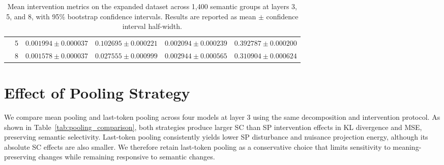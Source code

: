 \begin{table}[!htbp]
\begin{tabular}{p{1.5cm} p{0.75cm} p{2.00cm} p{2.00cm} p{2.00cm} p{2.00cm}}
& 5
& $0.001994 \pm 0.000037$
& $0.102695 \pm 0.000221$
& $0.002094 \pm 0.000239$
& $0.392787 \pm 0.000200$ \\
& 8
& $0.001578 \pm 0.000037$
& $0.027555 \pm 0.000999$
& $0.002944 \pm 0.000565$
& $0.310904 \pm 0.000624$ \\
\bottomrule
\end{tabular}
\vspace{0.4em}
\caption{Mean intervention metrics on the expanded dataset across 1,400 semantic groups at layers 3, 5, and 8, with 95\% bootstrap confidence intervals. Results are reported as mean $\pm$ confidence interval half-width.}
\label{tab:intervention_bootstrap_ci}
\vspace{-1.0em}
\end{table}


\section{Effect of Pooling Strategy}
\label{app:pooling}

We compare mean pooling and last-token pooling across four models at layer 3 using the same decomposition and intervention protocol. As shown in Table~\ref{tab:pooling_comparison}, both strategies produce larger SC than SP intervention effects in KL divergence and MSE, preserving semantic selectivity. Last-token pooling consistently yields lower SP disturbance and nuisance projection energy, although its absolute SC effects are also smaller. We therefore retain last-token pooling as a conservative choice that limits sensitivity to meaning-preserving changes while remaining responsive to semantic changes.

